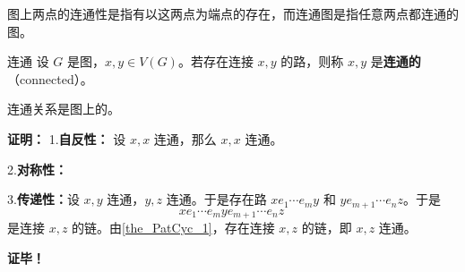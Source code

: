 图上两点的连通性是指有以这两点为端点的存在，而连通图是指任意两点都连通的图。

\begin{definition}{连通}
设 $G$ 是图，$x,y\in V(G)$。若存在连接 $x,y$ 的路，则称 $x,y$ 是\textbf{连通的}（connected）。
\end{definition}

\begin{theorem}{}
连通关系是图上的。
\end{theorem}
\textbf{证明：}
1.\textbf{自反性：} 设 $x,x$ 连通，那么 $x,x$ 连通。

2.\textbf{对称性：} 

3.\textbf{传递性：}设 $x,y$ 连通，$y,z$ 连通。于是存在路 $xe_1\cdots e_m y$ 和 $ye_{m+1}\cdots e_{n}z$。于是
\begin{equation}
xe_1\cdots e_m ye_{m+1}\cdots e_{n}z~
\end{equation}
是连接 $x,z$ 的链。由\autoref{the_PatCyc_1}，存在连接 $x,z$ 的链，即 $x,z$ 连通。

\textbf{证毕！}





